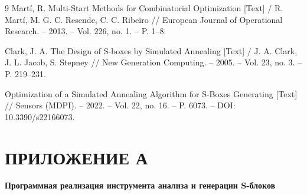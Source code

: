 \begin{thebibliography}{9}
Martí, R. Multi-Start Methods for Combinatorial Optimization [Text] / R. Martí, M. G. C. Resende, C. C. Ribeiro // European Journal of Operational Research. – 2013. – Vol. 226, no. 1. – P. 1–8.

Clark, J. A. The Design of S-boxes by Simulated Annealing [Text] / J. A. Clark, J. L. Jacob, S. Stepney // New Generation Computing. – 2005. – Vol. 23, no. 3. – P. 219–231.

Optimization of a Simulated Annealing Algorithm for S-Boxes Generating [Text] // Sensors (MDPI). – 2022. – Vol. 22, no. 16. – P. 6073. – DOI: 10.3390/s22166073.

\end{thebibliography}


\newpage
\section*{ПРИЛОЖЕНИЕ А}
\begin{center}
    \textbf{Программная реализация инструмента анализа и генерации S-блоков}
\end{center}


%
%
%
